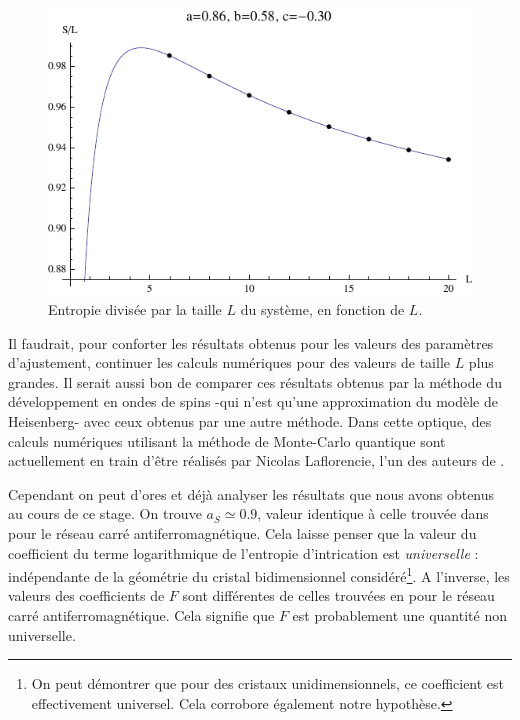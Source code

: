 \documentclass[a4paper, french]{report}
\newcommand{\1}{\ensuremath{\ket{\om_1\bom_1}}\xspace}
\newcommand{\2}{\ensuremath{\ket{\om_2\bom_2}}\xspace}
\begin{document}
\begin{figure}[htp]
\centering
\includegraphics[scale=1.00]{vector_img/ent.pdf}
\caption{Entropie divisée par la taille $L$ du système, en fonction de $L$.}
\label{res2}
\end{figure}

Il faudrait, pour conforter les résultats obtenus pour les valeurs des paramètres d'ajustement, continuer les calculs numériques pour des valeurs de taille $L$ plus grandes. Il serait aussi bon de comparer ces résultats obtenus par la méthode du développement en ondes de spins -qui n'est qu'une approximation du modèle de Heisenberg- avec ceux obtenus par une autre méthode. Dans cette optique, des calculs numériques utilisant la méthode de Monte-Carlo quantique sont actuellement en train d'être réalisés par Nicolas Laflorencie, l'un des auteurs de \cite{laflo}.

Cependant on peut d'ores et déjà analyser les résultats que nous avons obtenus au cours de ce stage. On trouve $a_S \simeq 0.9$, valeur identique à celle trouvée dans \cite{laflo} pour le réseau carré antiferromagnétique. Cela laisse penser que la valeur du coefficient du terme logarithmique de l'entropie d'intrication est \emph{universelle} : indépendante de la géométrie du cristal bidimensionnel considéré\footnote{On peut démontrer que pour des cristaux unidimensionnels, ce coefficient est effectivement universel. Cela corrobore également notre hypothèse.}.
A l'inverse, les valeurs des coefficients de $F$ sont différentes de celles trouvées en \cite{laflo} pour le réseau carré antiferromagnétique. Cela signifie que $F$ est probablement une quantité non universelle.
\end{document}
